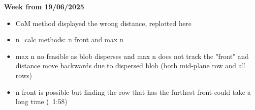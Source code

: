 \documentclass{article}
\begin{document}
\begin{arrowlist}
    \item \textbf{Week from 19/06/2025}
        \begin{itemize}
            \item CoM method displayed the wrong distance, replotted here
            \item n\_calc methods: n front and max n
            \item max n no feasible as blob disperses and max n does not track the "front" and distance move backwards due to dispersed blob (both mid-plane row and all rows)
            \item n front is possible but finding the row that has the furthest front could take a long time (~1:58)
        \end{itemize}
    
\end{arrowlist}



\nocite{*}
\printbibliography[title={References}]
\end{document}
